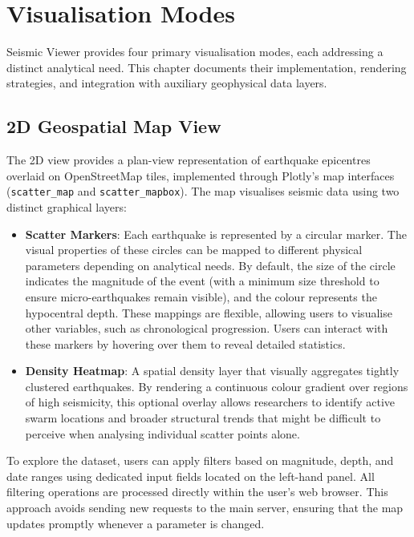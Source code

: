 
\chapter{Visualisation Modes}
\label{ch:visualisation}

Seismic Viewer provides four primary visualisation modes, each addressing a distinct analytical need. This chapter documents their implementation, rendering strategies, and integration with auxiliary geophysical data layers.

\section{2D Geospatial Map View}
\label{sec:view-2d}

The 2D view provides a plan-view representation of earthquake epicentres overlaid on OpenStreetMap \cite{openstreetmap} tiles, implemented through Plotly's map interfaces (\texttt{scatter\_map} and \texttt{scatter\_mapbox}). The map visualises seismic data using two distinct graphical layers:
\begin{itemize}
    \item \textbf{Scatter Markers}: Each earthquake is represented by a circular marker. The visual properties of these circles can be mapped to different physical parameters depending on analytical needs. By default, the size of the circle indicates the magnitude of the event (with a minimum size threshold to ensure micro-earthquakes remain visible), and the colour represents the hypocentral depth. These mappings are flexible, allowing users to visualise other variables, such as chronological progression. Users can interact with these markers by hovering over them to reveal detailed statistics.
    \item \textbf{Density Heatmap}: A spatial density layer that visually aggregates tightly clustered earthquakes. By rendering a continuous colour gradient over regions of high seismicity, this optional overlay allows researchers to identify active swarm locations and broader structural trends that might be difficult to perceive when analysing individual scatter points alone.
\end{itemize}

To explore the dataset, users can apply filters based on magnitude, depth, and date ranges using dedicated input fields located on the left-hand panel. All filtering operations are processed directly within the user's web browser. This approach avoids sending new requests to the main server, ensuring that the map updates promptly whenever a parameter is changed.

